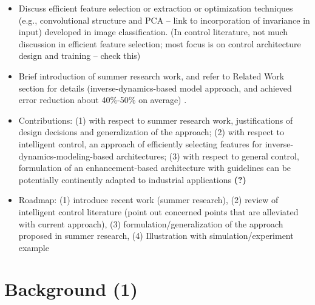 \begin{itemize}
\item Discuss efficient feature selection or extraction or optimization techniques (e.g., convolutional structure and PCA -- link to incorporation of invariance in input) developed in image classification. (In control literature, not much discussion in efficient feature selection; most focus is on control architecture design and training -- check this)
\item Brief introduction of summer research work, and refer to Related Work section for details (inverse-dynamics-based model approach, and achieved error reduction about 40\%-50\% on average) \cite{DNNimpromptuTrack}. \color{blue}{Fig. 1. Summer research paper architecture illustration}\color{grey1}
\item Contributions: (1) with respect to summer research work, justifications of design decisions and generalization of the approach; (2) with respect to intelligent control, an approach of efficiently selecting features for inverse-dynamics-modeling-based architectures; (3) with respect to general control, formulation of an enhancement-based architecture with guidelines can be potentially continently adapted to industrial applications \textbf{(?)}
\item Roadmap: (1) introduce recent work (summer research), (2) review of intelligent control literature (point out concerned points that are alleviated with current approach), (3) formulation/generalization of the approach proposed in summer research, (4) Illustration with simulation/experiment example
\end{itemize}

\section{Background (1)}
